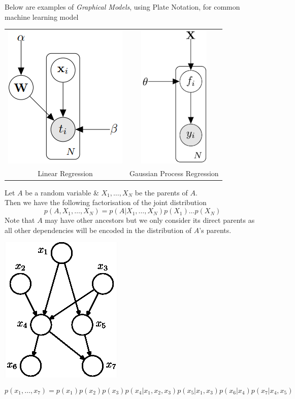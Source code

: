 \documentclass[11pt,a4paper]{article}
\begin{document}
Below are examples of \textit{Graphical Models}, using Plate Notation, for common machine learning model
\begin{center}\begin{tabular}{cc}
\includegraphics[scale=.5]{img/graphicalModel3.png}&\includegraphics[scale=.5]{img/graphicalModel4.png}\\
Linear Regression&Gaussian Process Regression
\end{tabular}\end{center}

Let $A$ be a random variable \& $X_1,\dots,X_N$ be the parents of $A$.\\
Then we have the following factorisation of the joint distribution
$$p(A,X_1,\dots,X_N)=p(A|X_1,\dots,X_N)p(X_1)\dots p(X_N)$$
Note that $A$ may have other ancestors but we only consider its direct parents as all other dependencies will be encoded in the distribution of $A$'s parents.\\

\begin{center}
\includegraphics[scale=.5]{img/graphicalModel2.png}
\end{center}
$$p(x_1,\dots,x_7)=p(x_1)p(x_2)p(x_3)p(x_4|x_1,x_2,x_3)p(x_5|x_1,x_3)p(x_6|x_4)p(x_7|x_4,x_5)$$
\end{document}
